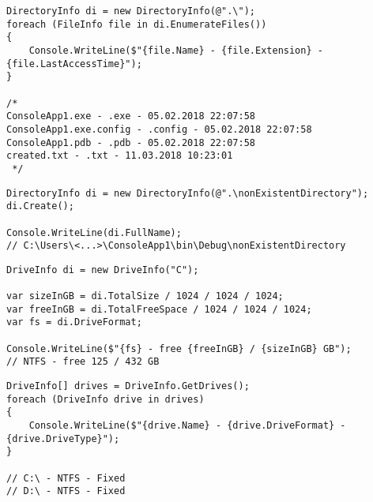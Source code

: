 \begin{frame}[fragile]
\begin{yesblock}
\begin{lstlisting}
DirectoryInfo di = new DirectoryInfo(@".\");
foreach (FileInfo file in di.EnumerateFiles())
{
    Console.WriteLine($"{file.Name} - {file.Extension} - {file.LastAccessTime}");
}

/*
ConsoleApp1.exe - .exe - 05.02.2018 22:07:58
ConsoleApp1.exe.config - .config - 05.02.2018 22:07:58
ConsoleApp1.pdb - .pdb - 05.02.2018 22:07:58
created.txt - .txt - 11.03.2018 10:23:01
 */
\end{lstlisting}
\end{yesblock}
\vfill
\begin{yesblock}
\begin{lstlisting}
DirectoryInfo di = new DirectoryInfo(@".\nonExistentDirectory");
di.Create();

Console.WriteLine(di.FullName);
// C:\Users\<...>\ConsoleApp1\bin\Debug\nonExistentDirectory
\end{lstlisting}
\end{yesblock}
\end{frame}



\begin{frame}[fragile]
\begin{yesblock}
\begin{lstlisting}
DriveInfo di = new DriveInfo("C");

var sizeInGB = di.TotalSize / 1024 / 1024 / 1024;
var freeInGB = di.TotalFreeSpace / 1024 / 1024 / 1024;
var fs = di.DriveFormat;

Console.WriteLine($"{fs} - free {freeInGB} / {sizeInGB} GB");
// NTFS - free 125 / 432 GB
\end{lstlisting}
\end{yesblock}
\vfill
\begin{yesblock}
\begin{lstlisting}
DriveInfo[] drives = DriveInfo.GetDrives();
foreach (DriveInfo drive in drives)
{
    Console.WriteLine($"{drive.Name} - {drive.DriveFormat} - {drive.DriveType}");
}

// C:\ - NTFS - Fixed
// D:\ - NTFS - Fixed
\end{lstlisting}
\end{yesblock}
\end{frame}







